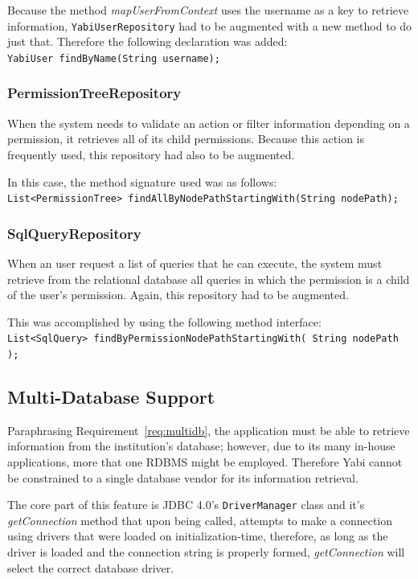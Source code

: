 Because the method \textit{mapUserFromContext} uses the username as a key to retrieve information, \texttt{YabiUserRepository} had to be augmented with a new method to do just that. Therefore the following declaration was added:\\
\texttt{YabiUser findByName(String username);}

\subsubsection{PermissionTreeRepository}
When the system needs to validate an action or filter information depending on a permission, it retrieves all of its child permissions. Because this action is frequently used, this repository had also to be augmented.

In this case, the method signature used was as follows:\\
\texttt{List<PermissionTree> findAllByNodePathStartingWith(String~nodePath);}

\subsubsection{SqlQueryRepository}
When an user request a list of queries that he can execute, the system must retrieve from the relational database all queries in which the permission is a child of the user's permission. Again, this repository had to be augmented.

This was accomplished by using the following method interface:\\
\texttt{List<SqlQuery> findByPermissionNodePathStartingWith( String~nodePath );}

\subsection{Multi-Database Support}\label{s:mdbs}
Paraphrasing Requirement~\ref{req:multidb}, the application must be able to retrieve information from the institution's database; however, due to its  many in-house applications, more that one \gls{RDBMS} might be employed. Therefore \gls{Yabi} cannot be constrained to a single database vendor for its information retrieval.

The core part of this feature is \gls{JDBC} 4.0's \texttt{DriverManager} class and it's \textit{getConnection} method that upon being called, attempts to make a connection using drivers that were loaded on initialization-time, therefore, as long as the driver is loaded and the connection string is properly formed, \textit{getConnection} will select the correct database driver.

